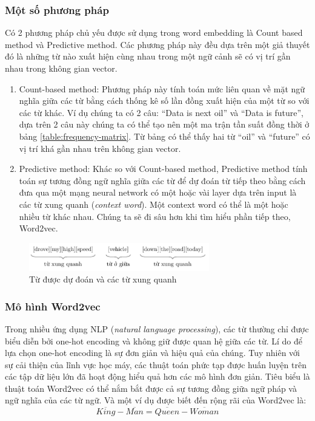 \subsubsection{Một số phương pháp}
Có 2 phương pháp chủ yếu được sử dụng trong word embedding là Count based method và Predictive method. Các phương pháp này đều dựa trên một giả thuyết đó là những từ nào xuất hiện cùng nhau trong một ngữ cảnh sẽ có vị trí gần nhau trong không gian vector. \cite{webpage12}
\begin{enumerate}
    \item Count-based method: Phương pháp này tính toán mức liên quan về mặt ngữ nghĩa giữa các từ bằng cách thống kê số lần đồng xuất hiện của một từ so với các từ khác. Ví dụ chúng ta có 2 câu: ``Data is next oil'' và ``Data is future'', dựa trên 2 câu này chúng ta có thể tạo nên một ma trận tần suất đồng thời ở bảng \ref{table:frequency-matrix}. Từ bảng có thể thấy hai từ ``oil'' và ``future'' có vị trí khá gần nhau trên không gian vector.
    \item Predictive method: Khác so với Count-based method, Predictive method tính toán sự tương đồng ngữ nghĩa giữa các từ để dự đoán từ tiếp theo bằng cách đưa qua một mạng neural network có một hoặc vài layer dựa trên input là các từ xung quanh (\textit{context word}). Một context word có thể là một hoặc nhiều từ khác nhau. Chúng ta sẽ đi sâu hơn khi tìm hiểu phần tiếp theo, Word2vec.
\end{enumerate}

\begin{figure}[htb]
    \centering
    \includegraphics[width=0.7\textwidth]{tikz_image/predictive_method.pdf}
    \caption{Từ được dự đoán và các từ xung quanh}
    \label{figure:predictive-method}
\end{figure}

\subsubsection{Mô hình Word2vec}
Trong nhiều ứng dụng NLP (\textit{natural language processing}), các từ thường chỉ được biểu diễn bởi one-hot encoding và không giữ được quan hệ giữa các từ. Lí do để lựa chọn one-hot encoding là sự đơn giản và hiệu quả của chúng. \cite{Aggarwal2022} Tuy nhiên với sự cải thiện của lĩnh vực học máy, các thuật toán phức tạp được huấn luyện trên các tập dữ liệu lớn đã hoạt động hiểu quả hơn các mô hình đơn giản. Tiêu biểu là thuật toán Word2vec có thể nắm bắt được cả sự tương đồng giữa ngữ pháp và ngữ nghĩa của các từ ngữ. Và một ví dụ được biết đến rộng rãi của Word2vec là:
\[
    \overline{King}-\overline{Man}=\overline{Queen}-\overline{Woman}
\]

